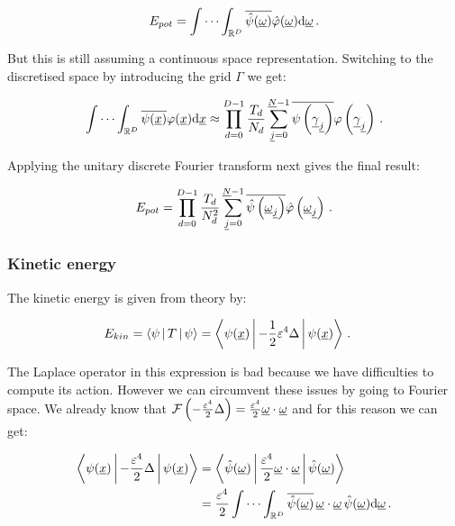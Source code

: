 \begin{align*}
  E_{pot} = \idotsint_{\mathbb{R}^D} \conj{\hat{\psi}(\vec{\omega})} \hat{\varphi}(\vec{\omega}) \mathrm{d}\vec{\omega} \,.
\end{align*}

But this is still assuming a continuous space representation. Switching to the
discretised space by introducing the grid $\Gamma$ we get:

\begin{equation*}
  \idotsint_{\mathbb{R}^D} \conj{\psi(\vec{x})} \varphi(\vec{x}) \mathrm{d}\vec{x}
  \approx
  \prod_{d=0}^{D-1} \frac{T_d}{N_d} \sum_{\vec{j}=0}^{\vec{N}-1}
                                    \conj{\psi\left(\vec{\gamma}_{\vec{j}}\right)}
                                    \varphi\left(\vec{\gamma}_{\vec{j}}\right) \,.
\end{equation*}

Applying the unitary discrete Fourier transform next gives the final result:

\begin{equation} \label{eq:epot_wf_scalar}
  E_{pot} = \prod_{d=0}^{D-1} \frac{T_d}{N_d^2} \sum_{\vec{j}=0}^{\vec{N}-1}
            \conj{\hat{\psi}\left(\vec{\omega}_{\vec{j}}\right)}
            \hat{\varphi}\left(\vec{\omega}_{\vec{j}}\right) \,.
\end{equation}


\subsubsection{Kinetic energy}


The kinetic energy is given from theory by:

\begin{align*}
  E_{kin} & = \Braket{\psi | T | \psi} = \Braket{\psi(\vec{x}) | -\frac{1}{2}\varepsilon^4 \Delta | \psi(\vec{x})} \,.
\end{align*}

The Laplace operator in this expression is bad because we have difficulties to
compute its action. However we can circumvent these issues by going to Fourier
space. We already know that $\ft{-\frac{\varepsilon^4}{2} \Delta} = \frac{\varepsilon^4}{2} \vec{\omega} \cdot \vec{\omega}$
and for this reason we can get:

\begin{align*}
  \Braket{\psi(\vec{x}) | -\frac{\varepsilon^4}{2} \Delta | \psi(\vec{x})}
  & = \Braket{\hat{\psi}(\vec{\omega}) | \frac{\varepsilon^4}{2} \vec{\omega} \cdot \vec{\omega} | \hat{\psi}(\vec{\omega})} \\
  & = \frac{\varepsilon^4}{2} \idotsint_{\mathbb{R}^D}
                              \conj{\hat{\psi}(\vec{\omega})} \, \vec{\omega} \cdot \vec{\omega} \, \hat{\psi}(\vec{\omega})
                              \mathrm{d}\vec{\omega} \,.
\end{align*}

